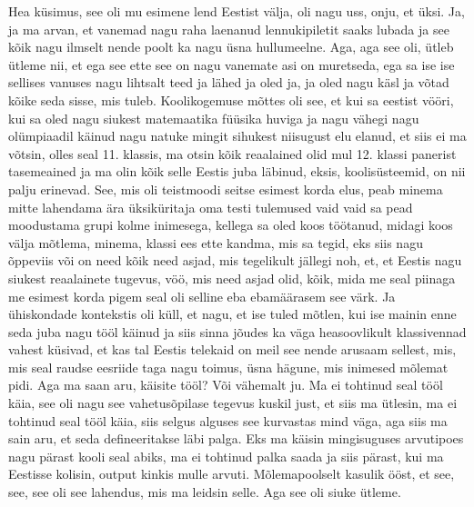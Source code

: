 Hea küsimus, see oli mu esimene lend Eestist välja, oli nagu uss, onju, et üksi. Ja, ja ma arvan, et vanemad nagu raha laenanud lennukipiletit saaks lubada ja see kõik nagu ilmselt nende poolt ka nagu üsna hullumeelne. Aga, aga see oli, ütleb ütleme nii, et ega see ette see on nagu vanemate asi on muretseda, ega sa ise ise sellises vanuses nagu lihtsalt teed ja lähed ja oled ja, ja oled nagu käsl ja võtad kõike seda sisse, mis tuleb. Koolikogemuse mõttes oli see, et kui sa eestist vööri, kui sa oled nagu siukest matemaatika füüsika huviga ja nagu vähegi nagu olümpiaadil käinud nagu natuke mingit sihukest niisugust elu elanud, et siis ei ma võtsin, olles seal 11. klassis, ma otsin kõik reaalained olid mul 12. klassi panerist tasemeained ja ma olin kõik selle Eestis juba läbinud, eksis, koolisüsteemid, on nii palju erinevad. See, mis oli teistmoodi seitse esimest korda elus, peab minema mitte lahendama ära üksiküritaja oma testi tulemused vaid vaid sa pead moodustama grupi kolme inimesega, kellega sa oled koos töötanud, midagi koos välja mõtlema, minema, klassi ees ette kandma, mis sa tegid, eks siis nagu õppeviis või on need kõik need asjad, mis tegelikult jällegi noh, et, et Eestis nagu siukest reaalainete tugevus, vöö, mis need asjad olid, kõik, mida me seal piinaga me esimest korda pigem seal oli selline eba ebamäärasem see värk. Ja ühiskondade kontekstis oli küll, et nagu, et ise tuled mõtlen, kui ise mainin enne seda juba nagu tööl käinud ja siis sinna jõudes ka väga heasoovlikult klassivennad vahest küsivad, et kas tal Eestis telekaid on meil see nende arusaam sellest, mis, mis seal raudse eesriide taga nagu toimus, üsna hägune, mis inimesed mõlemat pidi. Aga ma saan aru, käisite tööl? Või vähemalt ju. Ma ei tohtinud seal tööl käia, see oli nagu see vahetusõpilase tegevus kuskil just, et siis ma ütlesin, ma ei tohtinud seal tööl käia, siis selgus alguses see kurvastas mind väga, aga siis ma sain aru, et seda defineeritakse läbi palga. Eks ma käisin mingisuguses arvutipoes nagu pärast kooli seal abiks, ma ei tohtinud palka saada ja siis pärast, kui ma Eestisse kolisin, output kinkis mulle arvuti. Mõlemapoolselt kasulik ööst, et see, see, see oli see lahendus, mis ma leidsin selle. Aga see oli siuke ütleme.
